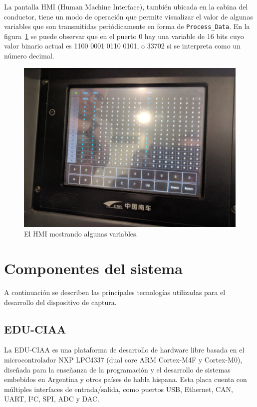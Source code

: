 La pantalla HMI (Human Machine Interface), también ubicada en la cabina del conductor, tiene un modo de operación que permite visualizar el valor de algunas variables que son transmitidas periódicamente en forma de \texttt{Process\_Data}. En la figura~\ref{fig:hmi} se puede observar que en el puerto 0 hay una variable de 16 bits cuyo valor binario actual es 1100 0001 0110 0101, o 33702 si se interpreta como un número decimal.

\begin{figure}[htbp]
	\centering
	\includegraphics[width=1\textwidth]{./Figures/hmi.jpg}
	\caption[El HMI mostrando algunas variables]{El HMI mostrando algunas variables.}
    \label{fig:hmi}
\end{figure}



\section{Componentes del sistema}

A continuación se describen las principales tecnologías utilizadas para el desarrollo del dispositivo de captura.

\subsection{EDU-CIAA}

La EDU-CIAA \cite{web:ciaa} es una plataforma de desarrollo de hardware libre basada en el microcontrolador NXP LPC4337 \cite{web:lpc4337} (dual core ARM Cortex-M4F y Cortex-M0), diseñada para la enseñanza de la programación y el desarrollo de sistemas embebidos en Argentina y otros países de habla hispana.
Esta placa cuenta con múltiples interfaces de entrada/salida, como puertos USB, Ethernet, CAN, UART, I²C, SPI, ADC y DAC.

